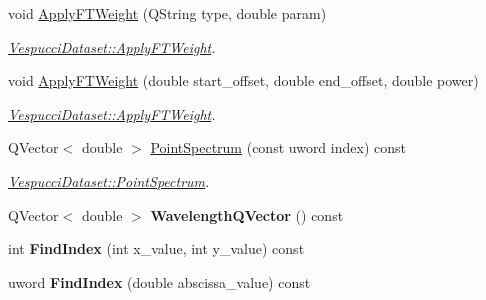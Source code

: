 \begin{DoxyCompactItemize}
\item 
void \hyperlink{class_vespucci_dataset_a5d9ccd6488f85e2c7384950607c4f947}{Apply\+F\+T\+Weight} (Q\+String type, double param)
\begin{DoxyCompactList}\small\item\em \hyperlink{class_vespucci_dataset_a5d9ccd6488f85e2c7384950607c4f947}{Vespucci\+Dataset\+::\+Apply\+F\+T\+Weight}. \end{DoxyCompactList}\item 
void \hyperlink{class_vespucci_dataset_ac4df2bfedc4cf1e0c0f62edfd3dbe4d0}{Apply\+F\+T\+Weight} (double start\+\_\+offset, double end\+\_\+offset, double power)
\begin{DoxyCompactList}\small\item\em \hyperlink{class_vespucci_dataset_a5d9ccd6488f85e2c7384950607c4f947}{Vespucci\+Dataset\+::\+Apply\+F\+T\+Weight}. \end{DoxyCompactList}\item 
Q\+Vector$<$ double $>$ \hyperlink{class_vespucci_dataset_a189afed18bdf0665fcff548663d93712}{Point\+Spectrum} (const uword index) const 
\begin{DoxyCompactList}\small\item\em \hyperlink{class_vespucci_dataset_a189afed18bdf0665fcff548663d93712}{Vespucci\+Dataset\+::\+Point\+Spectrum}. \end{DoxyCompactList}\item 
Q\+Vector$<$ double $>$ {\bfseries Wavelength\+Q\+Vector} () const \hypertarget{class_vespucci_dataset_a67a8ecc3605c8973621a621f3f1e75aa}{}\label{class_vespucci_dataset_a67a8ecc3605c8973621a621f3f1e75aa}

\item 
int {\bfseries Find\+Index} (int x\+\_\+value, int y\+\_\+value) const \hypertarget{class_vespucci_dataset_a8341aa44b9ccd80ca9a0a307d899f559}{}\label{class_vespucci_dataset_a8341aa44b9ccd80ca9a0a307d899f559}

\item 
uword {\bfseries Find\+Index} (double abscissa\+\_\+value) const \hypertarget{class_vespucci_dataset_a491f6167907cc7bb1cc3f50227663f0b}{}\label{class_vespucci_dataset_a491f6167907cc7bb1cc3f50227663f0b}


\end{DoxyCompactItemize}
